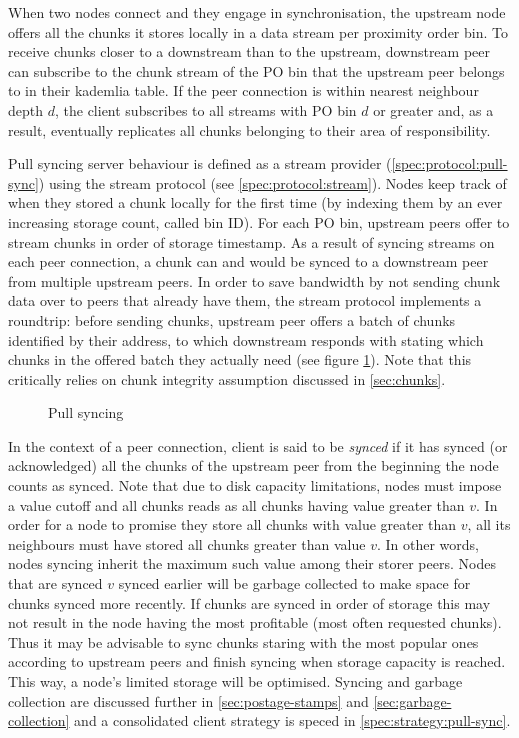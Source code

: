 When two nodes connect and they engage in synchronisation, the upstream node offers all the chunks it stores locally in a data stream per proximity order bin. To receive chunks closer to a downstream than to the upstream, downstream peer can subscribe to the chunk stream of the PO bin that the upstream peer belongs to in their kademlia table. If the peer connection is within nearest neighbour depth $d$, the client subscribes to all streams with PO bin $d$ or  greater and, as a result, eventually replicates all chunks belonging to their area of responsibility.

Pull  syncing server behaviour is defined as a stream provider (\ref{spec:protocol:pull-sync})  using the stream protocol (see \ref{spec:protocol:stream}). Nodes keep track of when they stored a chunk locally for the first time (by indexing them by an ever increasing storage count, called bin ID). For each PO bin, upstream peers offer to stream chunks in order of storage timestamp. As a result of syncing streams on each peer connection, a chunk can and would be synced to a downstream peer from multiple upstream peers.  In order to save bandwidth by not sending chunk data over to peers that already have them, the stream protocol implements a roundtrip: before sending chunks, upstream peer offers a batch of chunks identified by their address, to which downstream responds with stating which chunks in the offered batch they actually need (see figure \ref{fig:pull-syncing}). Note that this critically relies on chunk integrity assumption discussed in \ref{sec:chunks}.


\begin{figure}[htbp]
   \centering
   \caption{Pull syncing}
   \label{fig:pull-syncing}
\end{figure}

In the context of a peer connection, client is said to be \emph{synced} if it has synced (or acknowledged) all the chunks of the upstream peer from the beginning the node counts as synced. Note that due to disk capacity limitations, nodes must impose a value cutoff and all chunks reads as all chunks having value greater than $v$. In  order for a node to promise they store all chunks with value greater than $v$, all its neighbours must have stored all chunks greater than value $v$. In other words, nodes syncing   inherit the maximum such value among their storer peers. Nodes that are synced $v$ synced earlier will be garbage collected to make space for chunks synced more recently. If chunks are synced in order of storage this may not result in the node having the most profitable (most often requested chunks). Thus it may be advisable to sync chunks staring with the most popular ones according to upstream peers and finish syncing when storage capacity is reached. This way, a node's limited storage will be optimised. Syncing and garbage collection are discussed further in \ref{sec:postage-stamps} and \ref{sec:garbage-collection} and a consolidated client strategy is speced in \ref{spec:strategy:pull-sync}.

